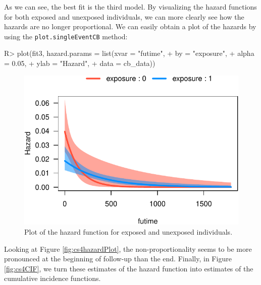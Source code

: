 \documentclass[
]{jss}
\begin{document}
As we can see, the best fit is the third model. By visualizing the
hazard functions for both exposed and unexposed individuals, we can more
clearly see how the hazards are no longer proportional. We can easily
obtain a plot of the hazards by using the \texttt{plot.singleEventCB}
method:

\begin{CodeChunk}

\begin{CodeInput}
R> plot(fit3, hazard.params = list(xvar = "futime",
+                                 by = "exposure",
+                                 alpha = 0.05,
+                                 ylab = "Hazard",
+                                 data = cb_data))
\end{CodeInput}
\begin{figure}[ht]

{\centering \includegraphics[width=\textwidth,keepaspectratio=true]{../figures/stanford-hazard-1} 

}

\caption{\label{fig:cs4hazardPlot} Plot of the hazard function for exposed and unexposed individuals.}\label{fig:stanford-hazard}
\end{figure}
\end{CodeChunk}

Looking at Figure \ref{fig:cs4hazardPlot}, the non-proportionality seems
to be more pronounced at the beginning of follow-up than the end.
Finally, in Figure \ref{fig:cs4CIF}, we turn these estimates of the
hazard function into estimates of the cumulative incidence functions.
\end{document}
